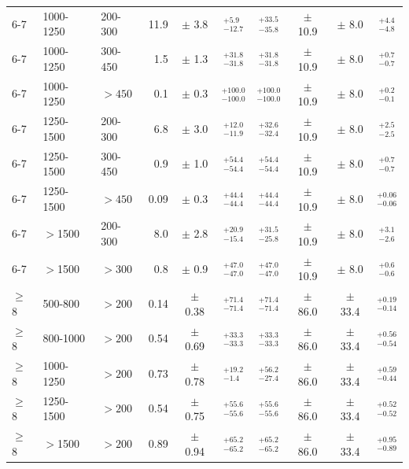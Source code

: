 \begin{table}[!hp]
{\begin{tabular}{lll|rc|cccc|c}
      \midrule
      6-7   & 1000-1250 & 200-300  &  11.9 & $\pm$  3.8  & $^{+5.9}_{-12.7}$ & $^{+33.5}_{-35.8}$  & $\pm$  10.9 & $\pm$ 8.0 & $^{+4.4}_{-4.8}$ \\
      6-7   & 1000-1250 & 300-450  &  1.5  & $\pm$  1.3  & $^{+31.8}_{-31.8}$ & $^{+31.8}_{-31.8}$  & $\pm$  10.9 &  $\pm$ 8.0 & $^{+0.7}_{-0.7}$ \\
      6-7   & 1000-1250 & $>450$   &  0.1  & $\pm$  0.3  & $^{+100.0}_{-100.0}$ & $^{+100.0}_{-100.0}$ & $\pm$  10.9 & $\pm$ 8.0 & $^{+0.2}_{-0.1}$ \\
      \midrule
      6-7   & 1250-1500 & 200-300  &  6.8  & $\pm$  3.0  & $^{+12.0}_{-11.9}$ & $^{+32.6}_{-32.4}$ & $\pm$   10.9   & $\pm$ 8.0 & $^{+2.5}_{-2.5}$ \\
      6-7   & 1250-1500 & 300-450  &  0.9  & $\pm$  1.0  & $^{+54.4}_{-54.4}$ & $^{+54.4}_{-54.4}$ & $\pm$   10.9   & $\pm$ 8.0 & $^{+0.7}_{-0.7}$ \\
      6-7   & 1250-1500 & $>450$   &  0.09 & $\pm$  0.3  & $^{+44.4}_{-44.4}$ & $^{+44.4}_{-44.4}$ & $\pm$   10.9  & $\pm$ 8.0 & $^{+0.06}_{-0.06}$\\
      \midrule
      6-7   & $>$1500   & 200-300  &  8.0  & $\pm$  2.8  & $^{+20.9}_{-15.4}$ & $^{+31.5}_{-25.8}$ & $\pm$   10.9  & $\pm$ 8.0 & $^{+3.1}_{-2.6}$\\
      6-7   & $>$1500   & $>300$   &  0.8  & $\pm$  0.9  & $^{+47.0}_{-47.0}$ & $^{+47.0}_{-47.0}$ & $\pm$   10.9  & $\pm$ 8.0 & $^{+0.6}_{-0.6}$ \\
      \midrule 
      \midrule 
      $\geq$8 & 500-800 & $>200$   &  0.14 & $\pm$  0.38 & $^{+71.4}_{-71.4}$ & $^{+71.4}_{-71.4}$ & $\pm$ 86.0  & $\pm$ 33.4 & $^{+0.19}_{-0.14}$ \\
      $\geq$8 & 800-1000 & $>200$  &  0.54 & $\pm$  0.69 & $^{+33.3}_{-33.3}$ & $^{+33.3}_{-33.3}$ & $\pm$ 86.0  & $\pm$ 33.4 & $^{+0.56}_{-0.54}$ \\
      $\geq$8 & 1000-1250 & $>200$ &  0.73 & $\pm$  0.78 & $^{+19.2}_{-1.4}$ & $^{+56.2}_{-27.4}$  & $\pm$ 86.0 & $\pm$ 33.4 & $^{+0.59}_{-0.44}$ \\
      $\geq$8 & 1250-1500 & $>200$ &  0.54 & $\pm$  0.75 & $^{+55.6}_{-55.6}$ & $^{+55.6}_{-55.6}$ & $\pm$ 86.0 & $\pm$ 33.4 & $^{+0.52}_{-0.52}$ \\
      $\geq$8 & $>$1500   & $>200$ &  0.89 & $\pm$  0.94 & $^{+65.2}_{-65.2}$ & $^{+65.2}_{-65.2}$ & $\pm$ 86.0 & $\pm$ 33.4 & $^{+0.95}_{-0.89}$ \\
      \bottomrule
    \end{tabular}}
\end{table}

